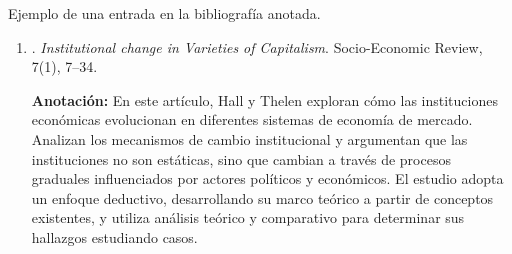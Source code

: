 \documentclass[11pt]{article}
\begin{document}
Ejemplo de una entrada en la bibliografía anotada.

\begin{enumerate}
  \item \citet{hall2009institutional}. \emph{Institutional change in Varieties of Capitalism}. Socio-Economic Review, 7(1), 7--34.

  \textbf{Anotación:} En este artículo, Hall y Thelen exploran cómo las instituciones económicas evolucionan en diferentes sistemas de economía de mercado. Analizan los mecanismos de cambio institucional y argumentan que las instituciones no son estáticas, sino que cambian a través de procesos graduales influenciados por actores políticos y económicos. El estudio adopta un enfoque deductivo, desarrollando su marco teórico a partir de conceptos existentes, y utiliza análisis teórico y comparativo para determinar sus hallazgos estudiando casos.


  
\end{enumerate}

\newpage %
\printbibliography[title={Bibliografía}, heading=subbibliography]
\end{document}
